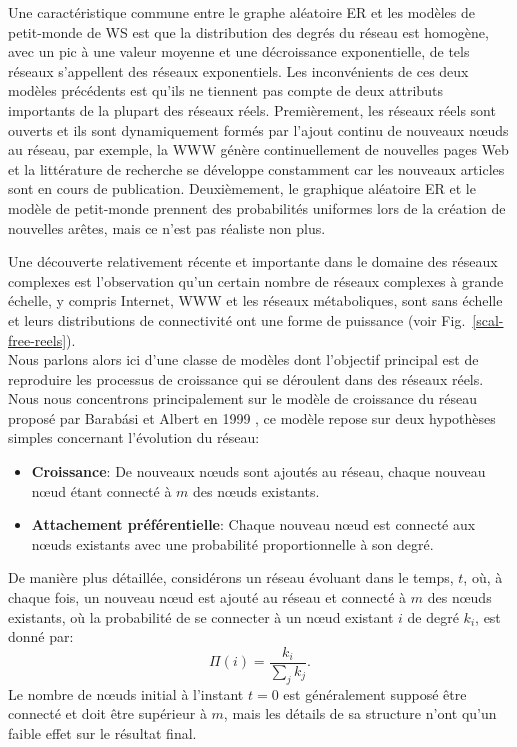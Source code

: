 Une caractéristique commune entre le graphe aléatoire ER et les modèles de petit-monde de WS est que la distribution des degrés du réseau est homogène, avec un pic à une valeur moyenne et une décroissance exponentielle, de tels réseaux s'appellent des réseaux exponentiels. Les inconvénients de ces deux modèles précédents est qu'ils ne tiennent pas compte de deux attributs importants de la plupart des réseaux réels.  Premièrement, les réseaux réels sont ouverts et ils sont dynamiquement formés par l'ajout continu de nouveaux nœuds au réseau, par exemple, la WWW génère continuellement de nouvelles pages Web et la littérature de recherche se développe constamment car les nouveaux articles sont en cours de publication. Deuxièmement, le graphique aléatoire ER et le modèle de petit-monde prennent des probabilités uniformes lors de la création de nouvelles arêtes, mais ce n'est pas réaliste non plus.

Une découverte relativement récente et importante dans le domaine des réseaux complexes est l'observation qu'un certain nombre de réseaux complexes à grande échelle, y compris Internet, WWW et les réseaux métaboliques, sont sans échelle et leurs distributions de connectivité ont une forme de puissance (voir Fig.~\ref{scal-free-reels}).\\
Nous parlons alors ici d'une classe de modèles dont l'objectif principal est de reproduire les processus de croissance qui se déroulent dans des réseaux réels. Nous nous concentrons principalement sur le modèle de croissance du réseau proposé par Barabási et Albert en 1999 \cite{BA1999}, ce modèle repose sur deux hypothèses simples concernant l'évolution du réseau:
\begin{itemize}
	\item \textbf{Croissance}: De nouveaux nœuds sont ajoutés au réseau, chaque nouveau nœud étant connecté à $m$ des nœuds existants.
	\item \textbf{Attachement préférentielle}: Chaque nouveau nœud est connecté aux nœuds existants avec une probabilité proportionnelle à son degré.
\end{itemize}
De manière plus détaillée, considérons un réseau évoluant dans le temps, $t$, où, à chaque fois, un nouveau nœud est ajouté au réseau et connecté à $m$ des nœuds existants, où la probabilité de se connecter à un nœud existant $i$ de degré $k_i$, est donné par:
\begin{equation}
\Pi(i)=\dfrac{k_i}{\sum_jk_j}.
\label{2-2}
\end{equation}
Le nombre de nœuds initial à l'instant $t=0$ est généralement supposé être connecté et doit être supérieur à $m$, mais les détails de sa structure n'ont qu'un faible effet sur le résultat final.\\

